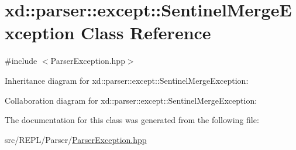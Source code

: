 \hypertarget{classxd_1_1parser_1_1except_1_1_sentinel_merge_exception}{}\section{xd\+:\+:parser\+:\+:except\+:\+:Sentinel\+Merge\+Exception Class Reference}
\label{classxd_1_1parser_1_1except_1_1_sentinel_merge_exception}


{\ttfamily \#include $<$Parser\+Exception.\+hpp$>$}



Inheritance diagram for xd\+:\+:parser\+:\+:except\+:\+:Sentinel\+Merge\+Exception\+:


Collaboration diagram for xd\+:\+:parser\+:\+:except\+:\+:Sentinel\+Merge\+Exception\+:


The documentation for this class was generated from the following file\+:\begin{DoxyCompactItemize}
\item 
src/\+R\+E\+P\+L/\+Parser/\mbox{\hyperlink{_parser_exception_8hpp}{Parser\+Exception.\+hpp}}\end{DoxyCompactItemize}
